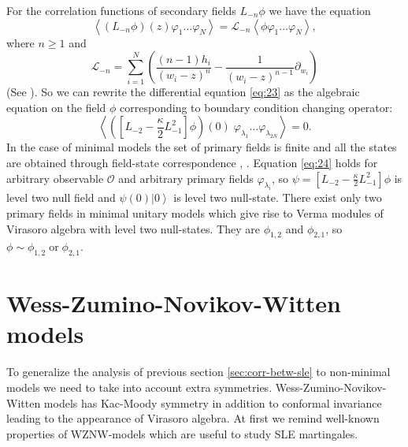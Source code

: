 \documentclass[a4paper]{jpconf}
\theoremstyle{definition}
\theoremstyle{definition} \newtheorem{Def}{Definition}
\begin{document}
For the correlation functions of secondary fields $L_{-n}\phi$ we have the equation 
\begin{equation}
\left< (L_{-n}\phi)(z) \varphi_{1}\dots \varphi_{N}\right>=\mathcal{L}_{-n}\left<\phi\varphi_{1}\dots\varphi_{N}\right>,
\end{equation}
 where $n\geq 1$ and
\begin{equation*}
  \mathcal{L}_{-n}=\sum_{i=1}^{N} \left(\frac{(n-1)h_{i}}{(w_{i}-z)^{n}} -\frac{1}{(w_{i}-z)^{n-1}}\partial_{w_{i}}\right)
\end{equation*}
(See \cite{difrancesco1997cft}). So we can rewrite the differential equation \eqref{eq:23} as the algebraic equation on the field $\phi$ corresponding to boundary condition changing operator:
\begin{equation}
  \label{eq:24}
   \left<\left([L_{-2}-\frac{\kappa}{2}L_{-1}^{2}]\phi\right)(0)\; \varphi_{\lambda_{1}}\dots \varphi_{\lambda_{{2N}}}\right>=0.
\end{equation}
In the case of minimal models the set of primary fields is finite and all the states are obtained through field-state correspondence \cite{belavin1984ics}, \cite{difrancesco1997cft}. 
Equation \eqref{eq:24}  holds for arbitrary observable $\mathcal{O}$ and arbitrary primary fields $\varphi_{\lambda_{i}}$, so $\psi=[L_{-2}-\frac{\kappa}{2}L_{-1}^{2}]\phi$ is level two null field and $\psi(0)\left|0\right>$ is level two null-state. There exist only two primary fields in minimal unitary models which give rise to Verma modules of Virasoro algebra with level two null-states. They are $\phi_{1,2}$ and $\phi_{2,1}$, so $\phi\sim \phi_{1,2} \;\text{or}\; \phi_{2,1}$. 

\section{Wess-Zumino-Novikov-Witten models}
\label{sec:sle-wzw-models}
To generalize the analysis of previous section \ref{sec:corr-betw-sle} to non-minimal models we need to take into account extra symmetries. Wess-Zumino-Novikov-Witten models has Kac-Moody symmetry in addition to conformal invariance leading to the appearance of Virasoro algebra. At first we remind well-known properties of WZNW-models \cite{difrancesco1997cft} which are useful to study SLE martingales. 
\end{document}
